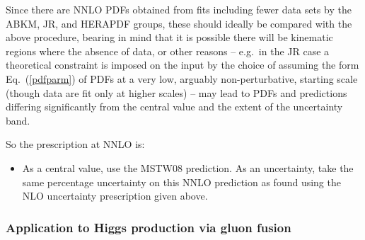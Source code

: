 Since there are NNLO PDFs obtained from fits including fewer data sets by 
the ABKM, JR, and HERAPDF groups, these should ideally be compared with the 
above procedure, bearing in mind that it is possible there will be kinematic 
regions where the absence of data, or other reasons -- e.g.\ in the JR case 
a theoretical 
constraint is imposed on the input by the choice of assuming the form
Eq.~(\ref{pdfparm}) of PDFs at a very low, arguably non-perturbative,
starting scale (though data are fit only at higher scales) -- may lead to PDFs and predictions differing 
significantly from the central value and the extent of the uncertainty band.


So the prescription at NNLO is:

\begin{itemize}

\item As a central value, use the MSTW08 prediction. As an uncertainty, take the same percentage uncertainty on this NNLO prediction as found using the  NLO uncertainty prescription given above.

\end{itemize}


\subsubsection{Application to Higgs production via gluon fusion}
\label{sec:pdf4lchiggs}



